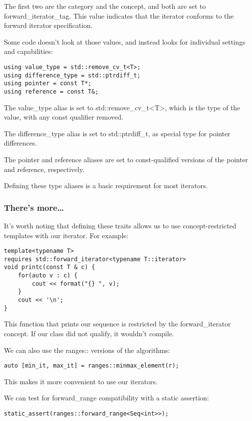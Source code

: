 The first two are the category and the concept, and both are set to forward\_iterator\_tag. This value indicates that the iterator conforms to the forward iterator specification.

Some code doesn't look at those values, and instead looks for individual settings and capabilities:

\begin{lstlisting}[style=styleCXX]
using value_type = std::remove_cv_t<T>;
using difference_type = std::ptrdiff_t;
using pointer = const T*;
using reference = const T&;
\end{lstlisting}

The value\_type alias is set to std::remove\_cv\_t<T>, which is the type of the value, with any const qualifier removed.

The difference\_type alias is set to std::ptrdiff\_t, as special type for pointer differences.

The pointer and reference aliases are set to const-qualified versions of the pointer and reference, respectively.

Defining these type aliases is a basic requirement for most iterators.

\subsubsection{There's more…}

It's worth noting that defining these traits allows us to use concept-restricted templates with our iterator. For example:

\begin{lstlisting}[style=styleCXX]
template<typename T>
requires std::forward_iterator<typename T::iterator>
void printc(const T & c) {
	for(auto v : c) {
		cout << format("{} ", v);
	}
	cout << '\n';
}
\end{lstlisting}

This function that prints our sequence is restricted by the forward\_iterator concept. If our class did not qualify, it wouldn't compile.

We can also use the ranges:: versions of the algorithms:

\begin{lstlisting}[style=styleCXX]
auto [min_it, max_it] = ranges::minmax_element(r);
\end{lstlisting}

This makes it more convenient to use our iterators.

We can test for forward\_range compatibility with a static assertion:

\begin{lstlisting}[style=styleCXX]
static_assert(ranges::forward_range<Seq<int>>);
\end{lstlisting}









